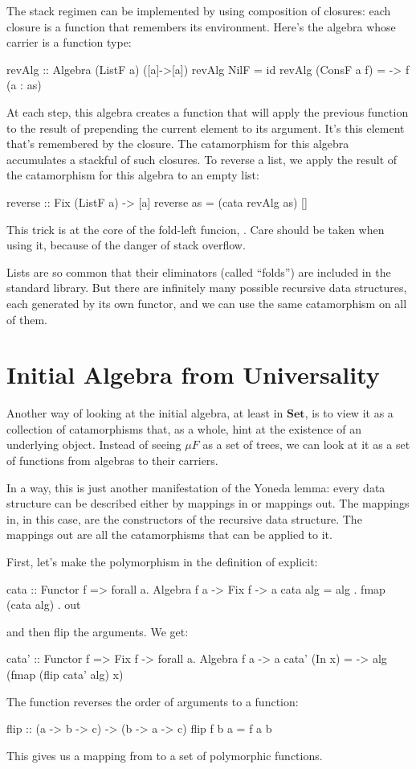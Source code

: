 \documentclass[DaoFP]{subfiles}
\begin{document}
The stack regimen can be implemented by using composition of closures: each closure is a function that remembers its environment. Here's the algebra whose carrier is a function type:
\begin{haskell}
revAlg :: Algebra (ListF a) ([a]->[a])
revAlg NilF = id
revAlg (ConsF a f) = \as -> f (a : as)
\end{haskell}
At each step, this algebra creates a function that will apply the previous function  to the result of prepending the current element  to its argument. It's this element that's remembered by the closure. The catamorphism for this algebra accumulates a stackful of such closures. To reverse a list, we apply the result of the catamorphism for this algebra to an empty list:
\begin{haskell}
reverse :: Fix (ListF a) -> [a]
reverse as = (cata revAlg as) []
\end{haskell}
This trick is at the core of the fold-left funcion, . Care should be taken when using it, because of the danger of stack overflow. 

Lists are so common that their eliminators (called ``folds'') are included in the standard library. But there are infinitely many possible recursive data structures, each generated by its own functor, and we can use the same catamorphism on all of them.

\section{Initial Algebra from Universality}

Another way of looking at the initial algebra, at least in $\mathbf{Set}$, is to view it as a collection of catamorphisms that, as a whole, hint at the existence of an underlying object. Instead of seeing $\mu F$ as a set of trees, we can look at it as a set of functions from algebras to their carriers. 

In a way, this is just another manifestation of the Yoneda lemma: every data structure can be described either by mappings in or mappings out. The mappings in, in this case, are the constructors of the recursive data structure. The mappings out are all the catamorphisms that can be applied to it.

First, let's make the polymorphism in the definition of  explicit:
\begin{haskell}
cata :: Functor f => forall a. Algebra f a -> Fix f -> a
cata alg = alg . fmap (cata alg) . out
\end{haskell}
and then flip the arguments. We get:
\begin{haskell}
cata' :: Functor f => Fix f -> forall a. Algebra f a -> a
cata' (In x) = \alg -> alg (fmap (flip cata' alg) x)
\end{haskell}
The function  reverses the order of arguments to a function:
\begin{haskell}
flip :: (a -> b -> c) -> (b -> a -> c)
flip f b a = f a b
\end{haskell}
This gives us a mapping from  to a set of polymorphic functions.
\end{document}
